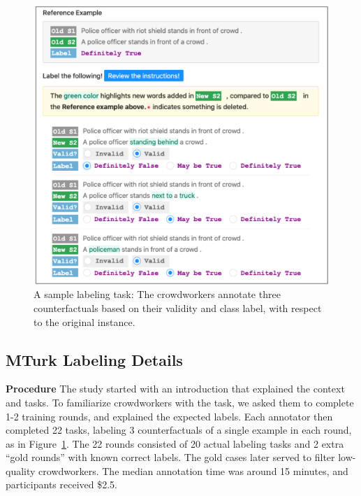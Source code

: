 \begin{figure}
\centering
\vspace{10pt}
\includegraphics[width=0.9\columnwidth]{figures/mturk_label}
\vspace{-5pt}
\caption{A sample labeling task: The crowdworkers annotate three counterfactuals based on their validity and class label, with respect to the original instance.}
\vspace{-15pt}
\label{fig:mturk_ui}
\end{figure}



\subsection{MTurk Labeling Details}
\label{appendix:label_instruct}


\textbf{Procedure}
The study started with an introduction that explained the context and tasks.
To familiarize crowdworkers with the task, we asked them to complete 1-2 training rounds, and explained the expected labels.
Each annotator then completed 22 tasks, labeling 3 counterfactuals of a single example in each round, as in Figure~\ref{fig:mturk_ui}.
The 22 rounds consisted of 20 actual labeling tasks and 2 extra ``gold rounds'' with known correct labels.
The gold cases later served to filter low-quality crowdworkers.
The median annotation time was around 15 minutes, and participants received \$2.5.

